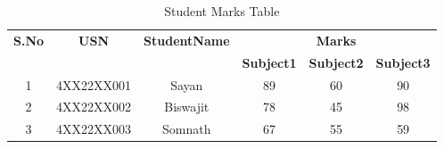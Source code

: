 \documentclass{article}
\begin{document}
\begin{table}[h!]
    \centering
    \caption{Student Marks Table}
    \begin{tabular}{|c|c|c|c|c|c|}
        \hline
        \textbf{S.No} & \textbf{USN} & \textbf{StudentName} & \multicolumn{3}{c|}{\textbf{Marks}} \\
        \cline{4-6}
        & & & \textbf{Subject1} & \textbf{Subject2} & \textbf{Subject3} \\
        \hline
        1 & 4XX22XX001 & Sayan & 89 & 60 & 90 \\
        \hline
        2 & 4XX22XX002 & Biswajit & 78 & 45 & 98 \\
        \hline
        3 & 4XX22XX003 & Somnath & 67 & 55 & 59 \\
        \hline
    \end{tabular}
    \label{tab:studentmarks}
\end{table}
\end{document}
